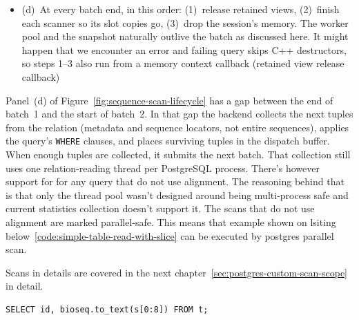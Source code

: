 \begin{itemize}
  Using templated types could be possible here, but they still would need type erasure.
  A retained view additionally holds a release callback (C-style destructor)
  \item (d)~At every batch end, in this order: (1)~release retained views, (2)~finish each scanner so its slot copies go, (3)~drop the session's memory.
  The worker pool and the snapshot naturally outlive the batch as discussed here.
  It might happen that we encounter an error and failing query skips C++ destructors, so steps 1--3 also run from a memory context callback (retained view release callback)
\label{lst:sequence-scan-lifecycle-steps}
\end{itemize}


Panel~(d) of Figure~\ref{fig:sequence-scan-lifecycle} has a gap between the end of batch~1 and the start of batch~2.
In that gap the backend collects the next tuples from the relation (metadata and sequence locators, not entire sequences), applies the query's \texttt{WHERE} clauses, and places surviving tuples in the dispatch buffer.
When enough tuples are collected, it submits the next batch.
That collection still uses one relation-reading thread per PostgreSQL process.
There's however support for  for any query that do not use alignment. 
The reasoning behind that is that only the thread pool wasn't designed around being multi-process safe and current statistics collection doesn't support it.
The scans that do not use alignment are marked parallel-safe. This means that example shown on lsiting below~\ref{code:simple-table-read-with-slice} can be executed by postgres parallel scan.

Scans in details are covered in the next chapter~\ref{sec:postgres-custom-scan-scope} in detail.

\noindent\begin{minipage}{\linewidth}
\begin{lstlisting}[style=bioseq-search-sql,caption={Simple table read},label=code:simple-table-read-with-slice]
  SELECT id, bioseq.to_text(s[0:8]) FROM t;
\end{lstlisting}
\end{minipage}

